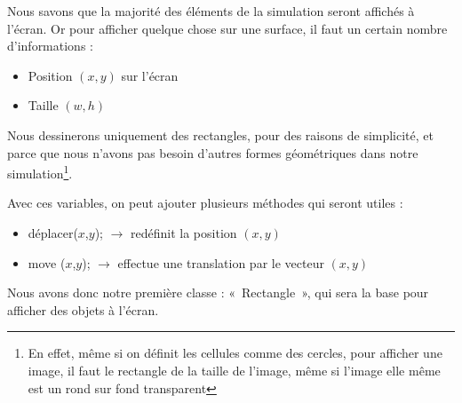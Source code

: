 Nous savons que la majorité des éléments de la simulation seront affichés à l'écran.
Or pour afficher quelque chose sur une surface, il faut un certain nombre d'informations : 
\begin{itemize}
  \item Position $(x,y)$ sur l'écran
  \item Taille $(w,h)$
\end{itemize}

Nous dessinerons uniquement des rectangles, pour des raisons de simplicité, et parce que nous n'avons pas besoin d'autres formes géométriques dans notre simulation\footnote{En effet, même si on définit les cellules comme des cercles, pour afficher une image, il faut le rectangle de la taille de l'image, même si l'image elle même est un rond sur fond transparent}.

Avec ces variables, on peut ajouter plusieurs méthodes qui seront utiles :
\begin{itemize}
  \item déplacer($x$,$y$); $\rightarrow$ redéfinit la position $(x,y)$
  \item move ($x$,$y$); $\rightarrow$ effectue une translation par le vecteur $(x,y)$
\end{itemize}

Nous avons donc notre première classe : «~Rectangle~», qui sera la base pour afficher des objets à l'écran.
